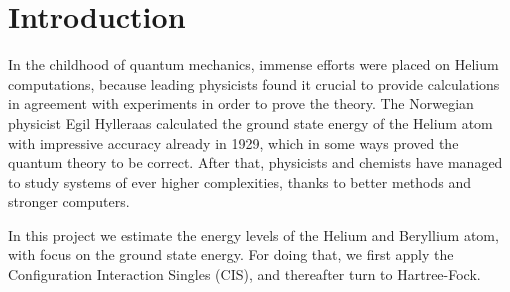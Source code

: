 \section{Introduction} \label{sec:introduction}
In the childhood of quantum mechanics, immense efforts were placed on Helium computations, because leading physicists found it crucial to provide calculations in agreement with experiments in order to prove the theory. The Norwegian physicist Egil Hylleraas calculated the ground state energy of the Helium atom with impressive accuracy already in 1929, which in some ways proved the quantum theory to be correct. After that, physicists and chemists have managed to study systems of ever higher complexities, thanks to better methods and stronger computers.

In this project we estimate the energy levels of the Helium and Beryllium atom, with focus on the ground state energy. For doing that, we first apply the Configuration Interaction Singles (CIS), and thereafter turn to Hartree-Fock. 


